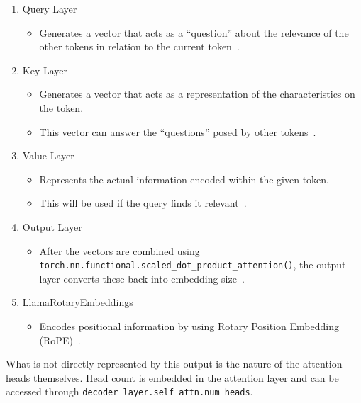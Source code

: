 \documentclass{article}
\begin{document}
    \begin{enumerate}
        \item Query Layer
        \begin{itemize}
            \item Generates a vector that acts as a ``question'' about the relevance of the other tokens in relation to the current token~\cite{bahdanau2016neuralmachinetranslationjointly}.
        \end{itemize}
        \item Key Layer
        \begin{itemize}
            \item Generates a vector that acts as a representation of the characteristics on the token.
            \item This vector can answer the ``questions'' posed by other tokens~\cite{bahdanau2016neuralmachinetranslationjointly}.
        \end{itemize}
        \item Value Layer
        \begin{itemize}
            \item Represents the actual information encoded within the given token.
            \item This will be used if the query finds it relevant~\cite{bahdanau2016neuralmachinetranslationjointly}.
        \end{itemize}
        \item Output Layer
        \begin{itemize}
            \item After the vectors are combined using \texttt{torch.nn.functional.scaled\_dot\_product\_attention()}, the output layer converts these back into embedding size~\cite{huggingface_transformers_llama}.
        \end{itemize}
        \item LlamaRotaryEmbeddings
        \begin{itemize}
            \item Encodes positional information by using Rotary Position Embedding (RoPE)~\cite{su2023roformerenhancedtransformerrotary}.
        \end{itemize}
    \end{enumerate}

    What is not directly represented by this output is the nature of the attention heads themselves.
    Head count is embedded in the attention layer and can be accessed through \texttt{decoder\_layer.self\_attn.num\_heads}.
\end{document}
